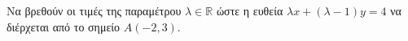 Να βρεθούν οι τιμές της παραμέτρου $ \lambda\in\mathbb{R} $ ώστε η ευθεία $ \lambda x+(\lambda-1)y=4 $ να διέρχεται από το σημείο $ A(-2,3) $.
